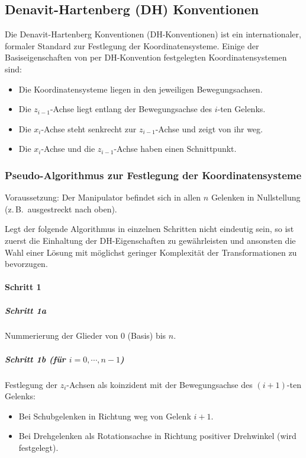 \documentclass[a4paper, 11pt, accentcolor = tud3b]{tudreport}
\newcommand{\zB}{z.\,B.~}
\begin{document}
			\subsection{Denavit-Hartenberg (DH) Konventionen}
				Die Denavit-Hartenberg Konventionen (DH-Konventionen) ist ein internationaler, formaler Standard zur Festlegung der Koordinatensysteme. Einige der Basiseigenschaften von per DH-Konvention festgelegten Koordinatensystemen sind:
				\begin{itemize}
					\item Die Koordinatensysteme liegen in den jeweiligen Bewegungsachsen.
					\item Die \( z_{i - 1} \)-Achse liegt entlang der Bewegungsachse des \(i\)-ten Gelenks.
					\item Die \(x_i\)-Achse steht senkrecht zur \(z_{i - 1}\)-Achse und zeigt von ihr weg.
					\item Die \(x_i\)-Achse und die \(z_{i - 1}\)-Achse haben einen Schnittpunkt.
				\end{itemize}
			
				\subsubsection{Pseudo-Algorithmus zur Festlegung der Koordinatensysteme}
					Voraussetzung: Der Manipulator befindet sich in allen \(n\) Gelenken in Nullstellung (\zB ausgestreckt nach oben).
					
					Legt der folgende Algorithmus in einzelnen Schritten nicht eindeutig sein, so ist zuerst die Einhaltung der DH-Eigenschaften zu gewährleisten und ansonsten die Wahl einer Lösung mit möglichst geringer Komplexität der Transformationen zu bevorzugen.
					
					\paragraph{Schritt 1}
						\subparagraph{Schritt 1a}
						Nummerierung der Glieder von \(0\) (Basis) bis \(n\).
						
						\subparagraph{Schritt 1b (für \( i = 0, \cdots, n - 1 \))}
						Festlegung der \(z_i\)-Achsen als koinzident mit der Bewegungsachse des \( (i + 1) \)-ten Gelenks:
						\begin{itemize}
							\item Bei Schubgelenken in Richtung weg von Gelenk \(i + 1\).
							\item Bei Drehgelenken als Rotationsachse in Richtung positiver Drehwinkel (wird festgelegt).
						\end{itemize}
					
\end{document}
